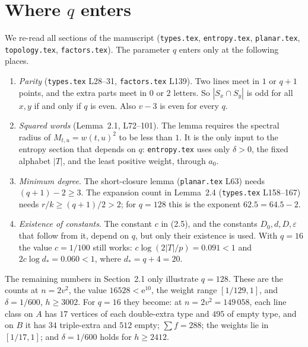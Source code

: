\documentclass[11pt]{amsart}
\newcommand{\ee}{\mathrm e}
\theoremstyle{remark}
\begin{document}
\section{Where $q$ enters}
We re-read all sections of the manuscript (\texttt{types.tex},
\texttt{entropy.tex}, \texttt{planar.tex}, \texttt{topology.tex},
\texttt{factors.tex}). The parameter $q$ enters only at the following places.
\begin{enumerate}
\item \emph{Parity} (\texttt{types.tex} L28--31, \texttt{factors.tex} L139).
Two lines meet in $1$ or $q+1$ points, and the extra parts meet in $0$ or $2$
letters. So $|S_x\cap S_y|$ is odd for all $x,y$ if and only if $q$ is even.
Also $v-3$ is even for every $q$.
\item \emph{Squared words} (Lemma~2.1, L72--101). The lemma requires the
spectral radius of $M_{t,u}=w(t,u)^2$ to be less than $1$. It is the only
input to the entropy section that depends on $q$: \texttt{entropy.tex} uses
only $\delta>0$, the fixed alphabet $|T|$, and the least positive weight,
through $a_0$.
\item \emph{Minimum degree}. The short-closure lemma (\texttt{planar.tex}
L63) needs $(q+1)-2\ge3$. The expansion count in Lemma~2.4
(\texttt{types.tex} L158--167) needs
$r/k\ge(q+1)/2>2$; for $q=128$ this is the exponent $62.5=64.5-2$.
\item \emph{Existence of constants}. The constant $c$ in (2.5), and the
constants $D_0,d,D,\varepsilon$ that follow from it, depend on $q$, but only
their existence is used. With $q=16$ the value $c=1/100$ still works:
$c\log(2|T|/p)=0.091<1$ and $2c\log d_*=0.060<1$, where $d_*=q+4=20$.
\end{enumerate}
The remaining numbers in Section~2.1 only illustrate $q=128$. These are the
counts at $n=2v^2$, the value $16528<\ee^{10}$, the weight range
$[1/129,1]$, and $\delta=1/600$, $h\ge3002$. For $q=16$ they become: at
$n=2v^2=149\,058$, each line class on $A$ has $17$ vertices of each
double-extra type and $495$ of empty type, and on $B$ it has $34$
triple-extra and $512$ empty; $\sum f=288$; the weights lie in
$[1/17,1]$; and $\delta=1/600$ holds for $h\ge2412$.
\end{document}
